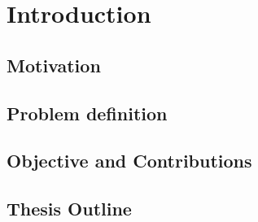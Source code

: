\chapter{Introduction}
\section{Motivation}
\section{Problem definition}
\section{Objective and Contributions}
\section{Thesis Outline}